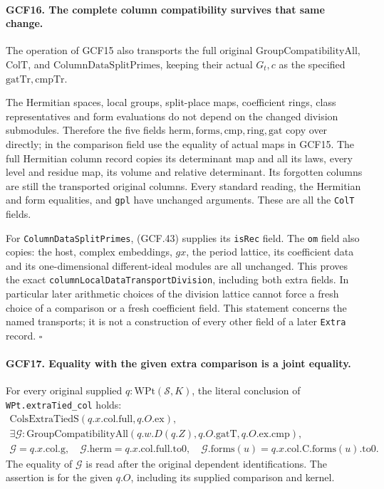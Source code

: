 \paragraph{GCF16. The complete column compatibility survives that same change.}
\label{claim:GCF16}
The operation of GCF15 also transports the full original
\(\mathrm{GroupCompatibilityAll}\), \(\mathrm{ColT}\), and
\(\mathrm{ColumnDataSplitPrimes}\), keeping their actual
\(G_t,c\) as the specified \(\mathrm{gatTr},\mathrm{cmpTr}\).

The Hermitian spaces, local groups, split-place maps, coefficient
rings, class representatives and form evaluations do not depend on
the changed division submodules.  Therefore the five fields
\(\mathrm{herm},\mathrm{forms},\mathrm{cmp},\mathrm{ring},
\mathrm{gat}\) copy over directly; in the comparison field use
the equality of actual maps in GCF15.  The full Hermitian column
record copies its determinant map and all its laws, every level
and residue map, its volume and relative determinant.  Its forgotten
columns are still the transported original columns.  Every standard
reading, the Hermitian and form equalities, and \texttt{gpl} have
unchanged arguments.  These are all the \texttt{ColT} fields.

For \texttt{ColumnDataSplitPrimes}, (GCF.43) supplies its
\texttt{isRec} field.  The \texttt{om} field also copies: the host,
complex embeddings, \(gx\), the period lattice, its coefficient
data and its one-dimensional different-ideal modules are all
unchanged.  This proves the exact
\texttt{columnLocalDataTransportDivision}, including both extra
fields.  In particular later arithmetic choices of the division
lattice cannot force a fresh choice of a comparison or a fresh
coefficient field.  This statement concerns the named transports;
it is not a construction of every other field of a later
\texttt{Extra} record.
\hfill\(\square\)

\paragraph{GCF17. Equality with the given extra comparison is a joint equality.}
\label{claim:GCF17}
For every original supplied \(q:\mathrm{WPt}(\mathcal S,K)\),
the literal conclusion of \texttt{WPt.extraTied\_col} holds:
\[
 \begin{gathered}
  \mathrm{ColsExtraTiedS}(q.x.\mathrm{col.full},q.O.\mathrm{ex}),\\
  \exists\mathcal G:\mathrm{GroupCompatibilityAll}
                (q.w.D(q.Z),q.O.\mathrm{gatT},q.O.\mathrm{ex.cmp}),\\
  \mathcal G=q.x.\mathrm{col.g},\quad
  \mathcal G.\mathrm{herm}=q.x.\mathrm{col.full.to0},\quad
  \mathcal G.\mathrm{forms}(u)=q.x.\mathrm{col.C.forms}(u).\mathrm{to0}.
 \end{gathered}                                                   \tag{GCF.44}
\]
The equality of \(\mathcal G\) is read after the original dependent
identifications.  The assertion is for the given \(q.O\), including
its supplied comparison and kernel.

